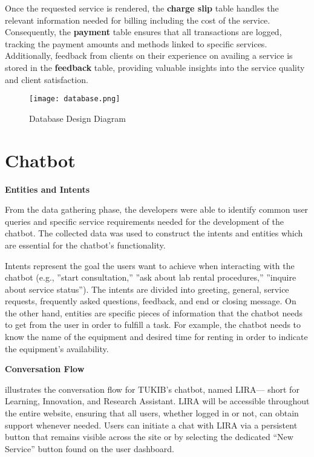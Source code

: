 Once the requested service is rendered, the \textbf{charge slip} table handles the relevant information needed for billing including the cost of the service. Consequently, the \textbf{payment} table ensures that all transactions are logged, tracking the payment amounts and methods linked to specific services. Additionally, feedback from clients on their experience on availing a service is stored in the \textbf{feedback} table, providing valuable insights into the service quality and client satisfaction.

\begin{figure}[h]
	\centering 
	\texttt{[image: database.png]}
	\caption{Database Design Diagram}
	\label{fig:database}
\end{figure}

\newpage

\section{Chatbot}

\textbf{Entities and Intents}

From the data gathering phase, the developers were able to identify common user queries and specific service requirements needed for the development of the chatbot. The collected data was used to construct the intents and entities which are essential for the chatbot’s functionality. 

Intents represent the goal the users want to achieve when interacting with the chatbot (e.g., ”start consultation,” ”ask about lab rental procedures,” ”inquire about service status”). The intents are divided into greeting, general, service requests, frequently asked questions, feedback, and end or closing message. On the other hand, entities are specific pieces of information that the chatbot needs to get from the user in order to fulfill a task. For example, the chatbot needs to know the name of the equipment and desired time for renting in order to indicate the equipment's availability. 

\noindent \textbf{Conversation Flow}

 illustrates the conversation flow for TUKIB's chatbot, named LIRA— short for Learning, Innovation, and Research Assistant. LIRA will be accessible throughout the entire website, ensuring that all users, whether logged in or not, can obtain support whenever needed. Users can initiate a chat with LIRA via a persistent button that remains visible across the site or by selecting the dedicated “New Service” button found on the user dashboard.

